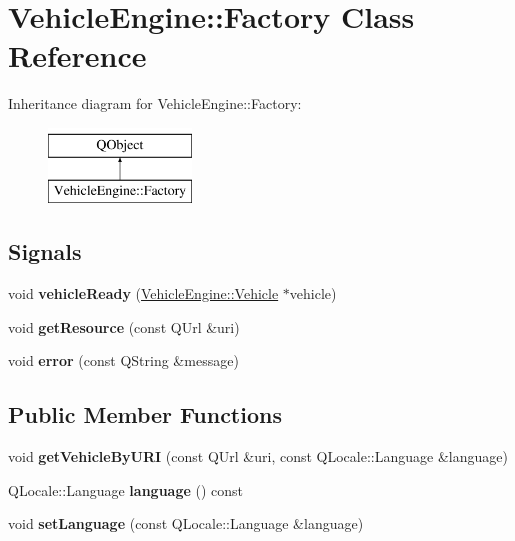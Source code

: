 \hypertarget{classVehicleEngine_1_1Factory}{}\section{Vehicle\+Engine\+:\+:Factory Class Reference}
\label{classVehicleEngine_1_1Factory}
Inheritance diagram for Vehicle\+Engine\+:\+:Factory\+:\begin{figure}[H]
\begin{center}
\leavevmode
\includegraphics[height=2.000000cm]{classVehicleEngine_1_1Factory}
\end{center}
\end{figure}
\subsection*{Signals}
\begin{DoxyCompactItemize}
\item 
\mbox{\label{classVehicleEngine_1_1Factory_af23bdc01d77eb6c9feb7f79f00511c22}} 
void {\bfseries vehicle\+Ready} (\mbox{\hyperlink{classVehicleEngine_1_1Vehicle}{Vehicle\+Engine\+::\+Vehicle}} $\ast$vehicle)
\item 
\mbox{\label{classVehicleEngine_1_1Factory_a72f608e6196d6e0824302c914baf5247}} 
void {\bfseries get\+Resource} (const Q\+Url \&uri)
\item 
\mbox{\label{classVehicleEngine_1_1Factory_a6f3a429ae4109615d43d75fb9dc0767d}} 
void {\bfseries error} (const Q\+String \&message)
\end{DoxyCompactItemize}
\subsection*{Public Member Functions}
\begin{DoxyCompactItemize}
\item 
\mbox{\label{classVehicleEngine_1_1Factory_a217155cea1486b498ac22f9f1dbaf5d6}} 
void {\bfseries get\+Vehicle\+By\+U\+RI} (const Q\+Url \&uri, const Q\+Locale\+::\+Language \&language)
\item 
\mbox{\label{classVehicleEngine_1_1Factory_a209085165273b23198942c1ff0253fa9}} 
Q\+Locale\+::\+Language {\bfseries language} () const
\item 
\mbox{\label{classVehicleEngine_1_1Factory_ad1c125ca1398b70e3be6f8997050823b}} 
void {\bfseries set\+Language} (const Q\+Locale\+::\+Language \&language)
\end{DoxyCompactItemize}
